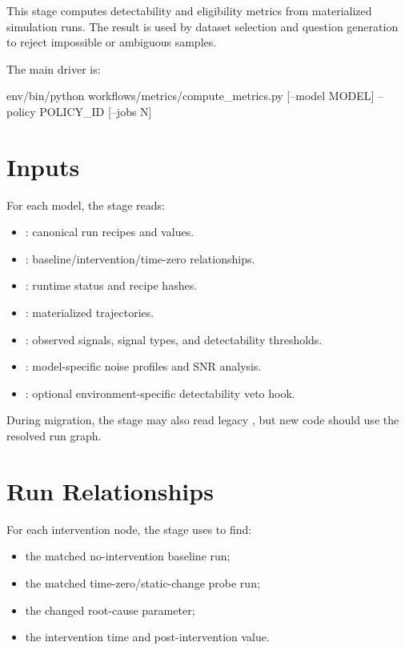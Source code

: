 \documentclass[11pt]{article}
\begin{document}
\label{docstart:compute_metrics_stage}

This stage computes detectability and eligibility metrics from materialized simulation runs.
The result is used by dataset selection and question generation to reject impossible or ambiguous samples.

The main driver is:

\begin{DocCode}
env/bin/python workflows/metrics/compute_metrics.py [--model MODEL] --policy POLICY_ID [--jobs N]
\end{DocCode}

\section*{Inputs}

For each model, the stage reads:

\begin{itemize}
\item {}: canonical run recipes and  values.
\item {}: baseline/intervention/time-zero relationships.
\item {}: runtime status and recipe hashes.
\item {}: materialized trajectories.
\item {}: observed signals, signal types, and detectability thresholds.
\item {}: model-specific noise profiles and SNR analysis.
\item {}: optional environment-specific detectability veto hook.
\end{itemize}

During migration, the stage may also read legacy , but new code should use the resolved run graph.

\section*{Run Relationships}

For each intervention node, the stage uses  to find:

\begin{itemize}
\item the matched no-intervention baseline run;
\item the matched time-zero/static-change probe run;
\item the changed root-cause parameter;
\item the intervention time and post-intervention value.
\end{itemize}
\end{document}
